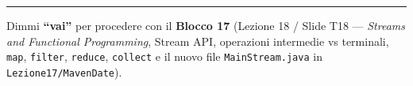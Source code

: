 \documentclass[11pt,a4paper]{article}
\newcommand{\passthrough}[1]{#1}
\begin{document}
\begin{center}\rule{0.5\linewidth}{0.5pt}\end{center}

Dimmi \textbf{``vai''} per procedere con il \textbf{Blocco 17} (Lezione
18 / Slide T18 --- \emph{Streams and Functional Programming}, Stream
API, operazioni intermedie vs terminali, \passthrough{\lstinline!map!},
\passthrough{\lstinline!filter!}, \passthrough{\lstinline!reduce!},
\passthrough{\lstinline!collect!} e il nuovo file
\passthrough{\lstinline!MainStream.java!} in
\passthrough{\lstinline!Lezione17/MavenDate!}).
\end{document}
